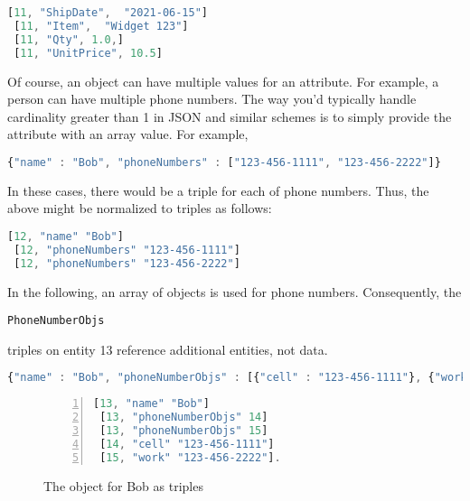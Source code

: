 \documentclass[9pt,letterpaper]{article}
\newcommand{\stt}[1]{\begin{footnotesize}\texttt{#1}\end{footnotesize}}
\begin{document}
\begin{lstlisting}[language=JavaScript,basicstyle=\ttfamily\scriptsize]
 [11, "ShipDate",  "2021-06-15"]
 [11, "Item",  "Widget 123"]
 [11, "Qty", 1.0,]
 [11, "UnitPrice", 10.5]
\end{lstlisting}

Of course, an object can have multiple values for an attribute.
For example, a person can have multiple phone numbers.
The way you'd typically handle cardinality greater than 1 in JSON and similar schemes is to simply provide the attribute with an array value.
For example,

\begin{lstlisting}[language=JavaScript,basicstyle=\ttfamily\scriptsize]
 {"name" : "Bob", "phoneNumbers" : ["123-456-1111", "123-456-2222"]}
\end{lstlisting}

In these cases, there would be a triple for each of phone numbers.
Thus, the above might be normalized to triples as follows:

\begin{lstlisting}[language=JavaScript,basicstyle=\ttfamily\scriptsize]
 [12, "name" "Bob"]
 [12, "phoneNumbers" "123-456-1111"]
 [12, "phoneNumbers" "123-456-2222"]
\end{lstlisting}

In the following, an array of objects is used for phone numbers.
Consequently, the \stt{PhoneNumberObjs} triples on entity 13 reference additional entities, not data.

\begin{lstlisting}[language=JavaScript,basicstyle=\ttfamily\scriptsize]
{"name" : "Bob", "phoneNumberObjs" : [{"cell" : "123-456-1111"}, {"work" : "123-456-2222"}]}
\end{lstlisting}

\begin{figure}[H]
  \caption{The object for Bob as triples}
  \label{code:bob-phone}
\begin{lstlisting}[language=JavaScript,numberstyle=\scriptsize,basicstyle=\ttfamily\scriptsize,numbers=left,stepnumber=1,breaklines=true]
 [13, "name" "Bob"]
 [13, "phoneNumberObjs" 14]
 [13, "phoneNumberObjs" 15]
 [14, "cell" "123-456-1111"]
 [15, "work" "123-456-2222"].
\end{lstlisting}
\end{figure}
\end{document}
